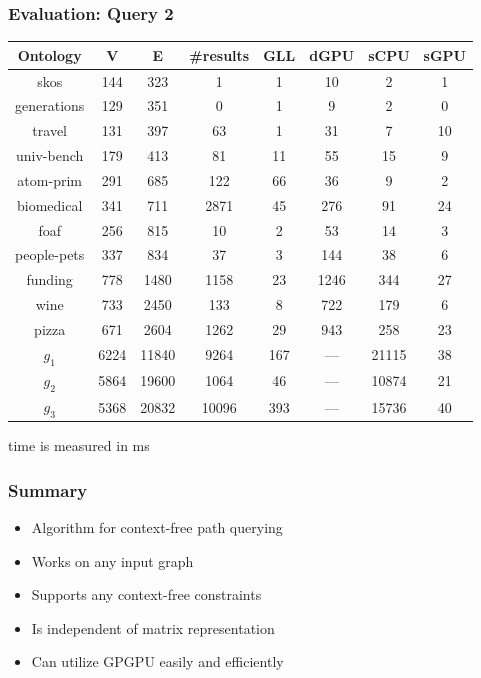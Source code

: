 \documentclass[xcolor=table]{beamer}
\begin{document}
\begin{frame}
  \transwipe[direction=90]
  \frametitle{Evaluation: Query 2}         
\begin{tabular}{ c | c | c | c | c | c | c | c }
Ontology & V & E & \#results & GLL & dGPU & sCPU & sGPU\\
\hline
skos        & 144 & 323 & 1 & 1 & 10 & 2 & 1\\
generations & 129 & 351 & 0 & 1 & 9 & 2 & 0\\
travel      & 131 & 397 & 63 & 1 & 31 & 7 & 10\\
univ-bench  & 179 & 413 & 81 & 11 & 55 & 15 & 9\\
atom-prim   & 291 & 685 & 122 & 66 & 36 & 9 & 2\\
biomedical  & 341 & 711 & 2871 & 45 & 276 & 91 & 24\\  %
foaf        & 256 & 815 & 10 & 2 & 53 & 14 & 3\\
people-pets & 337 & 834 & 37 & 3 & 144 & 38 & 6\\
funding     & 778 & 1480 & 1158 & 23 & 1246 & 344 & 27\\
wine        & 733 & 2450 & 133 & 8 & 722 & 179 & 6\\
pizza       & 671 & 2604 & 1262 & 29 & 943 & 258 & 23\\
$g_{1}$     & 6224 & 11840 & 9264 & 167 & --- & 21115 & 38\\
$g_{2}$     & 5864 & 19600 & 1064 & 46 & --- & 10874 & 21\\
$g_{3}$     & 5368 & 20832 & 10096 & 393 & --- & 15736 & 40\\
\end{tabular}

\begin{center} time is measured in ms \end{center}
\end{frame}     
            
            
\begin{frame}
  \transwipe[direction=90]
  \frametitle{Summary}         
\begin{itemize}
\item Algorithm for context-free path querying 
\item Works on any input graph
\item Supports any context-free constraints 
\item Is independent of matrix representation
\item Can utilize GPGPU easily and efficiently 
\end{itemize}
\end{frame}           
            
\end{document}
